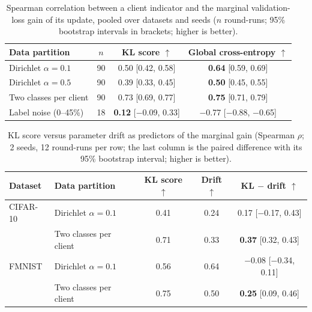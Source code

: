\documentclass[pdflatex,sn-mathphys-num,oneside]{sn-jnl}%
\theoremstyle{thmstyleone}%
\theoremstyle{thmstyletwo}%
\theoremstyle{thmstylethree}%
\newlength{\journalfloatwidth}
\begin{document}
\begin{table}[!htbp]
\centering
\footnotesize
\setlength{\tabcolsep}{4pt}
\renewcommand{\arraystretch}{1.08}
\caption{Spearman correlation between a client indicator and the marginal validation-loss gain of its update, pooled over datasets and seeds ($n$ round-runs; 95\% bootstrap intervals in brackets; higher is better).}
\label{tab:kl_validity}
\begin{tabular*}{\journalfloatwidth}{@{\extracolsep{\fill}}lccc@{}}
\toprule
Data partition & $n$ & KL score $\uparrow$ & Global cross-entropy $\uparrow$ \\
\midrule
Dirichlet $\alpha=0.1$ & 90 & 0.50 [0.42, 0.58] & \textbf{0.64} [0.59, 0.69] \\
Dirichlet $\alpha=0.5$ & 90 & 0.39 [0.33, 0.45] & \textbf{0.50} [0.45, 0.55] \\
Two classes per client & 90 & 0.73 [0.69, 0.77] & \textbf{0.75} [0.71, 0.79] \\
Label noise (0--45\%)  & 18 & \textbf{0.12} [$-$0.09, 0.33] & $-$0.77 [$-$0.88, $-$0.65] \\
\bottomrule
\end{tabular*}
\end{table}

\begin{table}[!htbp]
\centering
\footnotesize
\setlength{\tabcolsep}{4pt}
\renewcommand{\arraystretch}{1.08}
\caption{KL score versus parameter drift as predictors of the marginal gain (Spearman $\rho$; 2 seeds, 12 round-runs per row; the last column is the paired difference with its 95\% bootstrap interval; higher is better).}
\label{tab:kl_drift}
\begin{tabular*}{\journalfloatwidth}{@{\extracolsep{\fill}}llccc@{}}
\toprule
Dataset & Data partition & KL score $\uparrow$ & Drift $\uparrow$ & KL $-$ drift $\uparrow$ \\
\midrule
CIFAR-10 & Dirichlet $\alpha=0.1$ & 0.41 & 0.24 & 0.17 [$-$0.17, 0.43] \\
         & Two classes per client & 0.71 & 0.33 & \textbf{0.37} [0.32, 0.43] \\
FMNIST   & Dirichlet $\alpha=0.1$ & 0.56 & 0.64 & $-$0.08 [$-$0.34, 0.11] \\
         & Two classes per client & 0.75 & 0.50 & \textbf{0.25} [0.09, 0.46] \\
\bottomrule
\end{tabular*}
\end{table}
\end{document}
